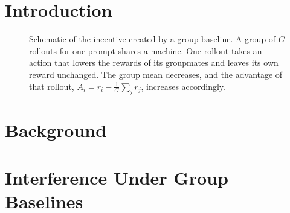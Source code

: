 \documentclass{article}
\theoremstyle{plain}
\theoremstyle{definition}
\newcommand{\placeholder}[1][1.3in]{%
  \fbox{\parbox[c][#1][c]{\dimexpr\linewidth-2\fboxsep-2\fboxrule\relax}{%
    \centering\small\itshape placeholder}}}
\begin{document}

\printAffiliationsAndNotice{}

\begin{abstract}
\end{abstract}

\section{Introduction}
\label{sec:intro}

\begin{figure}[t]
  \begin{center}
    \placeholder[1.6in]
    \caption{Schematic of the incentive created by a group baseline.
      A group of $G$ rollouts for one prompt shares a machine. One rollout
      takes an action that lowers the rewards of its groupmates and leaves its own
      reward unchanged. The group mean decreases, and the advantage of that
      rollout, $A_i = r_i - \frac{1}{G}\sum_j r_j$, increases accordingly.}
    \label{fig:schematic}
  \end{center}
\end{figure}

\section{Background}
\label{sec:background}


\section{Interference Under Group Baselines}
\label{sec:theory}
\end{document}
